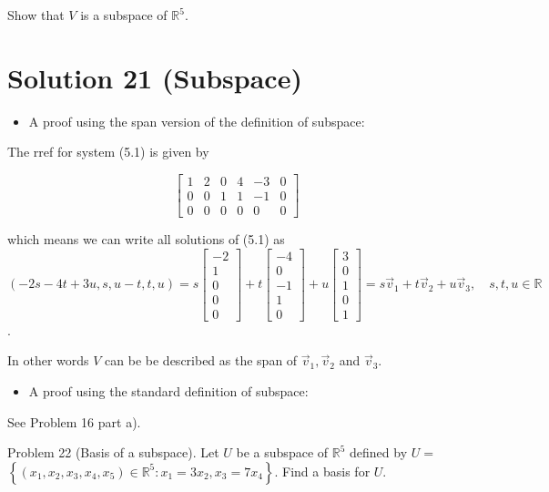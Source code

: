\documentclass[10pt]{article}
\begin{document}
Show that $V$ is a subspace of $\mathbb{R}^{5}$.

\section*{Solution 21 (Subspace)}
\begin{itemize}
  \item A proof using the span version of the definition of subspace:
\end{itemize}

The rref for system (5.1) is given by

$$
\left[\begin{array}{ccccc|c}
1 & 2 & 0 & 4 & -3 & 0 \\
0 & 0 & 1 & 1 & -1 & 0 \\
0 & 0 & 0 & 0 & 0 & 0
\end{array}\right]
$$

which means we can write all solutions of (5.1) as\\
$(-2 s-4 t+3 u, s, u-t, t, u)=s\left[\begin{array}{c}-2 \\ 1 \\ 0 \\ 0 \\ 0\end{array}\right]+t\left[\begin{array}{c}-4 \\ 0 \\ -1 \\ 1 \\ 0\end{array}\right]+u\left[\begin{array}{l}3 \\ 0 \\ 1 \\ 0 \\ 1\end{array}\right]=s \vec{v}_{1}+t \vec{v}_{2}+u \vec{v}_{3}, \quad s, t, u \in \mathbb{R}$.

In other words $V$ can be be described as the span of $\vec{v}_{1}, \vec{v}_{2}$ and $\vec{v}_{3}$.

\begin{itemize}
  \item A proof using the standard definition of subspace:
\end{itemize}

See Problem 16 part a).

Problem 22 (Basis of a subspace). Let $U$ be a subspace of $\mathbb{R}^{5}$ defined by $U=$ $\left\{\left(x_{1}, x_{2}, x_{3}, x_{4}, x_{5}\right) \in \mathbb{R}^{5}: x_{1}=3 x_{2}, x_{3}=7 x_{4}\right\}$. Find a basis for $U$.
\end{document}
